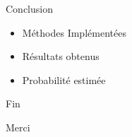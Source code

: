 \documentclass{beamer} %
\begin{document}
	\begin{frame}[t]{Conclusion}
		\begin{itemize}
			\item<+-> Méthodes Implémentées
			\item<+-> Résultats obtenus
			\item<+-> Probabilité estimée
		\end{itemize}
	\end{frame}
	\begin{frame}[c]{Fin}
		\begin{center}
		\Huge Merci
		\end{center}
	\end{frame}
\end{document}
